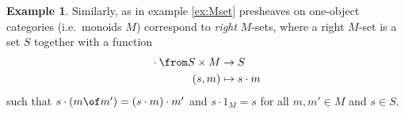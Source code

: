 \documentclass{article}
\theoremstyle{definition}
\newtheorem{example}{Example}
\begin{document}
\begin{example}
  Similarly, as in example \ref{ex:Mset} presheaves on one-object categories (i.e.\ monoids $M$) correspond to \emph{right} $M$-sets, where a right $M$-set is a set $S$ together with a function
  \begin{align*}
    {} \cdot {} \from S\times M&\to S\\
    (s,m)&\mapsto s\cdot m
  \end{align*}
  such that $s\cdot (m\of m')=(s\cdot m)\cdot m'$ and $s\cdot 1_M=s$ for all $m,m'\in M$ and $s\in S$.
\end{example}
\end{document}
